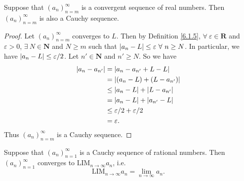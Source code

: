 \begin{proposition}\label{6.1.12}
Suppose that \((a_n)_{n = m}^\infty\) is a convergent sequence of real numbers.
Then \((a_n)_{n = m}^\infty\) is also a Cauchy sequence.
\end{proposition}

\begin{proof}
Let \((a_n)_{n = m}^\infty\) converges to \(L\).
Then by Definition \ref{6.1.5}, \(\forall\ \varepsilon \in \mathbf{R}\) and \(\varepsilon > 0\), \(\exists\ N \in \mathbf{N}\) and \(N \geq m\) such that \(\abs*{a_n - L} \leq \varepsilon \ \forall\ n \geq N\).
In particular, we have \(\abs*{a_n - L} \leq \varepsilon / 2\).
Let \(n' \in \mathbf{N}\) and \(n' \geq N\).
So we have
\begin{align*}
\abs*{a_n - a_{n'}} &= \abs*{a_n - a_{n'} + L - L} \\
&= \abs*{(a_n - L) + (L - a_{n'})} \\
&\leq \abs*{a_n - L} + \abs*{L - a_{n'}} \\
&= \abs*{a_n - L} + \abs*{a_{n'} - L} \\
&\leq \varepsilon / 2 + \varepsilon / 2 \\
&= \varepsilon.
\end{align*}
Thus \((a_n)_{n = m}^\infty\) is a Cauchy sequence.
\end{proof}

\setcounter{theorem}{14}
\begin{proposition}\label{6.1.15}
Suppose that \((a_n)_{n = 1}^\infty\) is a Cauchy sequence of rational numbers.
Then \((a_n)_{n = 1}^\infty\) converges to \(\text{LIM}_{n \to \infty} a_n\), i.e.
\[
    \text{LIM}_{n \to \infty} a_n = \lim_{n \to \infty} a_n.
\]
\end{proposition}

